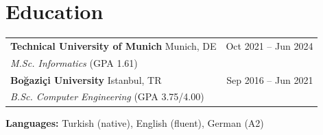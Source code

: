 \documentclass[a4paper,10pt]{article}
\begin{document}
\section{Education}
\noindent\begin{tabularx}{\linewidth}{@{}X r@{}}
  \textbf{Technical University of Munich} \textcolor{muted}{\small Munich, DE} & \textcolor{muted}{\small Oct 2021 -- Jun 2024}\\
  \textit{M.Sc. Informatics} \textcolor{muted}{\small (GPA 1.61)} & \\[0.45em]
  \textbf{Boğaziçi University} \textcolor{muted}{\small Istanbul, TR} & \textcolor{muted}{\small Sep 2016 -- Jun 2021}\\
  \textit{B.Sc. Computer Engineering} \textcolor{muted}{\small (GPA 3.75/4.00)} & \\
\end{tabularx}

\vspace{0.35em}
\noindent\textbf{\small Languages:}\; {\small Turkish (native), English (fluent), German (A2)}
\end{document}

